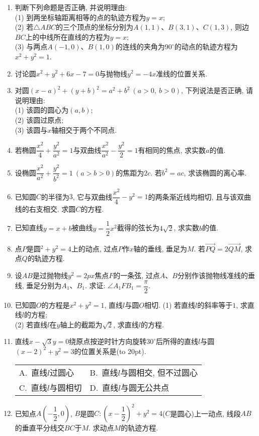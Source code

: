 \documentclass[10pt,a4paper]{article}
\newcommand{\bracket}[1]{(\hbox to #1pt{})}
\newcommand{\twoch}[4]{\par\begin{tabular}{p{.46\textwidth}p{.46\textwidth}}
A.~#1& B.~#2\\
C.~#3& D.~#4
\end{tabular}}
\begin{document}
\begin{enumerate}[1.]
\item 判断下列命题是否正确, 并说明理由:\\
(1) 到两坐标轴距离相等的点的轨迹方程为$y=x$;\\
(2) 若$\triangle ABC$的三个顶点的坐标分别为$A(1, 1)$、$B(3, 1)$、$C(1, 3)$, 则边$BC$上的中线所在直线的方程为$y=x$;\\
(3) 与两点$A(-1, 0)$、$B(1, 0)$的连线的夹角为$90^\circ$的动点的轨迹方程为$x^2+y^2=1$.
\item 讨论圆$x^2+y^2+6x-7=0$与抛物线$y^2=-4x$准线的位置关系.
\item 对圆$(x-a)^2+(y+b)^2=a^2+b^2\ (a>0, \ b>0)$, 下列说法是否正确, 请说明理由:\\
(1) 该圆的圆心为$(a, b)$;\\
(2) 该圆过原点;\\
(3) 该圆与$x$轴相交于两个不同点.
\item 若椭圆$\dfrac{x^2}{4}+\dfrac{y^2}{a^2}=1$与双曲线$\dfrac{x^2}{a^2}-\dfrac{y^2}2=1$有相同的焦点, 求实数$a$的值.
\item 设椭圆$\dfrac{x^2}{a^2}+\dfrac{y^2}{b^2}=1 \ (a>b>0)$的焦距为$2c$. 若$b^2=ac$, 求该椭圆的离心率.
\item 已知圆$C$的半径为$3$, 它与双曲线$\dfrac{x^2}4-y^2=1$的两条渐近线均相切, 且与该双曲线的右支相交. 求圆$C$的方程.
\item 已知直线$y=x+b$被曲线$y=\dfrac 12x^2$截得的弦长为$4\sqrt 2$, 求实数$b$的值.
\item 点$P$是圆$^2+y^2=4$上的动点, 过点$P$作$x$轴的垂线, 垂足为$M$. 若$\overrightarrow{PQ}=2\overrightarrow{QM}$, 求点$Q$的轨迹方程.
\item 设$AB$是过抛物线$y^2=2px$焦点$F$的一条弦, 过点$A$、$B$分别作该抛物线准线的垂线, 垂足分别为$A_1$、$B_1$. 求证: $\angle A_1FB_1=\dfrac\pi 2$.
\item 已知圆$O$的方程是$x^2+y^2=1$, 直线$l$与圆$O$相切.
(1) 若直线$l$的斜率等于$1$, 求直线$l$的方程;\\
(2) 若直线$l$在$y$轴上的截距为$\sqrt 2$, 求直线$l$的方程.
\item 直线$x-\sqrt 3y=0$绕原点按逆时针方向旋转$30^\circ$后所得的直线$l$与圆$(x-2)^2+y^2=3$的位置关系是\bracket{20}.
\twoch{直线$l$过圆心}{直线$l$与圆相交, 但不过圆心}{直线$l$与圆相切}{直线$l$与圆无公共点}
\item 已知点$A(-\dfrac 12, 0)$, $B$是圆$C: (x-\dfrac 12)^2+y^2=4$($C$是圆心)上一动点, 线段$AB$的垂直平分线交$BC$于$M$. 求动点$M$的轨迹方程.
\end{enumerate}
\end{document}
